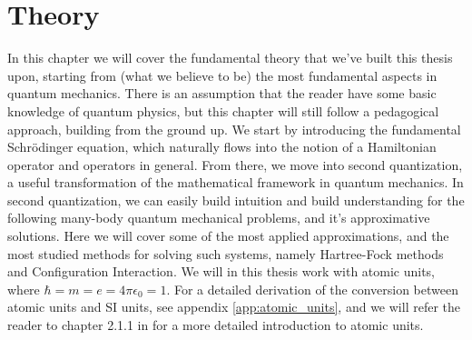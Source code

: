 \documentclass{subfiles}
\begin{document}
\chapter{Theory}
In this chapter we will cover the fundamental theory that we've built this thesis upon, starting from (what we believe to be) the most fundamental aspects in quantum mechanics.
There is an assumption that the reader have some basic knowledge of quantum physics, but this chapter will still follow a pedagogical approach, building from the ground up.
We start by introducing the fundamental Schrödinger equation, which naturally flows into the notion of a Hamiltonian operator and operators in general. From there, we move into 
second quantization, a useful transformation of the mathematical framework in quantum mechanics. In second quantization, we can easily build intuition and build understanding for
the following many-body quantum mechanical problems, and it's approximative solutions. Here we will cover some of the most applied approximations, and the most studied methods for solving
such systems, namely Hartree-Fock methods and Configuration Interaction. We will in this thesis work with atomic units, where $\hbar = m = e = 4\pi\epsilon_0 = 1$. For a detailed derivation of the conversion between atomic units and SI units, see appendix \ref{app:atomic_units}, and we will refer the reader to chapter 2.1.1 in \cite{szabo2012modern} for a more detailed introduction to atomic units.
\newpage



\end{document}
